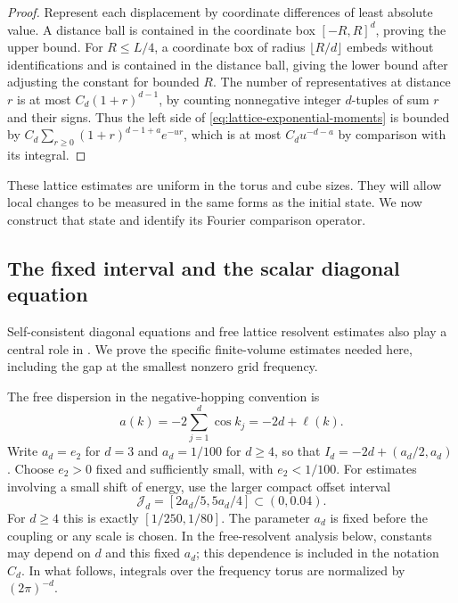 \begin{proof}
Represent each displacement by coordinate differences of least
absolute value. A distance ball is contained in the coordinate box
$[-R,R]^d$, proving the upper bound. For $R\le L/4$, a coordinate
box of radius $\lfloor R/d\rfloor$ embeds without identifications
and is contained in the distance ball, giving the lower bound after
adjusting the constant for bounded $R$. The number of representatives
at distance $r$ is at most $C_d(1+r)^{d-1}$, by counting nonnegative
integer $d$-tuples of sum $r$ and their signs. Thus the left side of
\eqref{eq:lattice-exponential-moments} is bounded by
$C_d\sum_{r\ge0}(1+r)^{d-1+a}e^{-ur}$, which is at most
$C_du^{-d-a}$ by comparison with its integral.
\end{proof}

These lattice estimates are uniform in the torus and cube sizes.
They will allow local changes to be measured in the same forms as the
initial state.  We now construct that state and identify its Fourier
comparison operator.

\subsection{The fixed interval and the scalar diagonal equation}

Self-consistent diagonal equations and free lattice resolvent estimates
also play a central role in
\cite[Section~2.2 and Appendix~A]{BlackDroginHernandez2025}.
We prove the specific finite-volume estimates needed here, including
the gap at the smallest nonzero grid frequency.

The free dispersion in the negative-hopping convention is
\[
 a(k)=-2\sum_{j=1}^d\cos k_j=-2d+\ell(k).
\]
Write $a_d=e_2$ for $d=3$ and $a_d=1/100$ for $d\ge4$, so that
$I_d=-2d+(a_d/2,a_d)$. Choose $e_2>0$ fixed and sufficiently small,
with $e_2<1/100$. For estimates involving a small shift of energy,
use the larger compact offset interval
\[
 \mathcal J_d=[2a_d/5,5a_d/4]\subset(0,0.04).
\]
For $d\ge4$ this is exactly $[1/250,1/80]$.
The parameter $a_d$ is fixed before the coupling or any scale is chosen.
In the free-resolvent analysis below, constants may depend on $d$ and this
fixed $a_d$; this dependence is included in the notation $C_d$.
In what follows, integrals over the frequency torus are
normalized by $(2\pi)^{-d}$.

